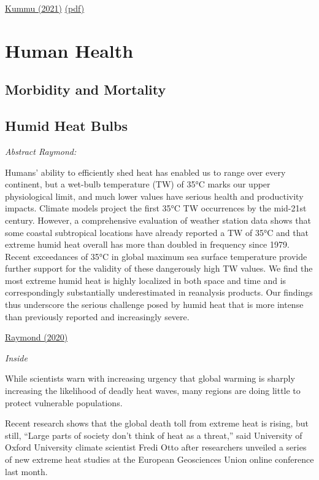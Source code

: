 \documentclass[
]{book}
\begin{document}
\href{https://www.cell.com/one-earth/fulltext/S2590-3322(21)00236-0}{Kummu (2021)}
\href{pdf/Kummu_2021_Food_outside_Safe_Climatic_Space.pdf}{(pdf)}

\hypertarget{human-health}{%
\chapter{Human Health}\label{human-health}}

\hypertarget{morbidity-and-mortality}{%
\section{Morbidity and Mortality}\label{morbidity-and-mortality}}

\hypertarget{humid-heat-bulbs}{%
\section{Humid Heat Bulbs}\label{humid-heat-bulbs}}

\emph{Abstract Raymond:}

Humans' ability to efficiently shed heat has enabled us to range over every continent,
but a wet-bulb temperature (TW) of 35°C marks our upper physiological limit,
and much lower values have serious health and productivity impacts.
Climate models project the first 35°C TW occurrences by the mid-21st century.
However, a comprehensive evaluation of weather station data shows that
some coastal subtropical locations have already reported a TW of 35°C and
that extreme humid heat overall has more than doubled in frequency since 1979.
Recent exceedances of 35°C in global maximum sea surface temperature provide further
support for the validity of these dangerously high TW values.
We find the most extreme humid heat is highly localized in both space and time and
is correspondingly substantially underestimated in reanalysis products.
Our findings thus underscore the serious challenge posed by humid heat
that is more intense than previously reported and increasingly severe.

\href{https://advances.sciencemag.org/content/6/19/eaaw1838}{Raymond (2020)}

\emph{Inside}

While scientists warn with increasing urgency that global warming is sharply increasing the likelihood of deadly heat waves, many regions are doing little to protect vulnerable populations.

Recent research shows that the global death toll from extreme heat is rising, but still, ``Large parts of society don't think of heat as a threat,'' said University of Oxford University climate scientist Fredi Otto after researchers unveiled a series of new extreme heat studies at the European Geosciences Union online conference last month.
\end{document}
